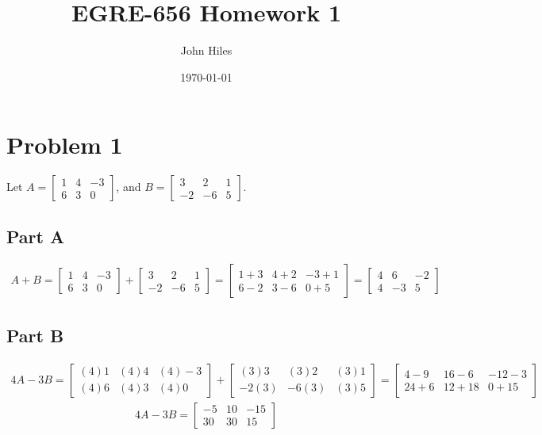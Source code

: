 \documentclass{article}
\title{EGRE-656 Homework 1}
\author{John Hiles}
\date\today
\begin{document}
\maketitle %


\section*{Problem 1}
Let $A = \begin{bmatrix}
1 & 4 & -3 \\
6 & 3 & 0
\end{bmatrix}$, and $B=\begin{bmatrix}
3 & 2 & 1 \\
-2 & -6 & 5
\end{bmatrix}$.
\subsection*{Part A}
\begin{align*}
A + B = \begin{bmatrix}
1 & 4 & -3 \\
6 & 3 & 0
\end{bmatrix} + \begin{bmatrix}
3 & 2 & 1 \\
-2 & -6 & 5
\end{bmatrix} = \begin{bmatrix}
1+3 & 4+2 & -3+1 \\
6-2 & 3-6 & 0+5
\end{bmatrix} =
\begin{bmatrix}
4 & 6 & -2 \\
4 & -3 & 5
\end{bmatrix}
\end{align*}
\subsection*{Part B}
\begin{align*}
4A - 3B = \begin{bmatrix}
(4)1 & (4)4 & (4)-3 \\
(4)6 & (4)3 & (4)0
\end{bmatrix} + \begin{bmatrix}
(3)3 & (3)2 & (3)1 \\
-2(3) & -6(3) & (3)5
\end{bmatrix} = \begin{bmatrix}
4-9 & 16-6 & -12-3 \\
24+6 & 12+18 & 0+15
\end{bmatrix}
\end{align*}
\begin{align*}
\boxed{4A - 3B =
\begin{bmatrix}
-5 & 10 & -15 \\
30 & 30 & 15
\end{bmatrix} }
\end{align*}
\end{document}
